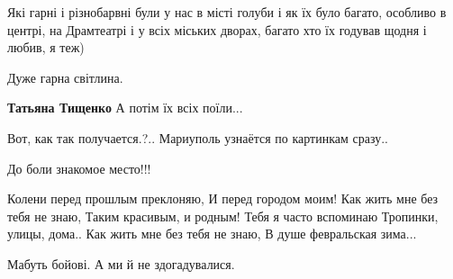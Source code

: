  
 
 
 
 

\qqSecCmt


Які гарні і різнобарвні були у нас в місті голуби і як їх було багато, особливо
в центрі, на Драмтеатрі і у всіх міських дворах, багато хто їх годував щодня і
любив, я теж)

Дуже гарна світлина.

\begin{itemize} %
\textbf{Татьяна Тищенко} А потім їх всіх поїли...
\end{itemize} %


Вот, как так получается.?.. Мариуполь узнаётся по картинкам сразу.. 🙁


До боли знакомое место!!!


\obeycr
Колени перед прошлым преклоняю,
И перед городом моим!
Как жить мне без тебя не знаю,
Таким красивым, и родным!
Тебя я часто вспоминаю
Тропинки, улицы, дома..
Как жить мне без тебя не знаю,
В душе февральская зима...
\restorecr


Мабуть бойові. А ми й не здогадувалися.
